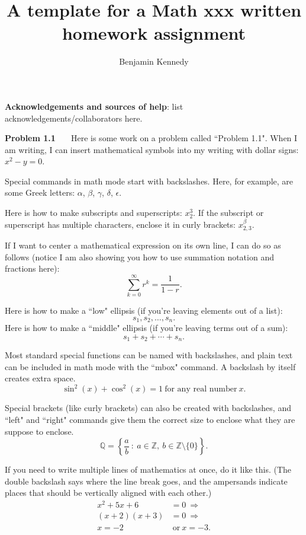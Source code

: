 \documentclass[10pt]{article}
\begin{document}
\title{A template for a Math xxx written homework assignment}

\author{Benjamin Kennedy}
\maketitle

\bigskip
\noindent
{\bf Acknowledgements and sources of help}: list acknowledgements/collaborators here.

\bigskip
\noindent
{\bf Problem 1.1 \ \ } Here is some work on a problem called ``Problem 1.1".  When I am writing, I can insert mathematical symbols into my writing with dollar signs: $x^2 - y = 0$.

Special commands in math mode start with backslashes.  Here, for example, are some Greek letters: $\alpha$, $\beta$, $\gamma$, $\delta$, $\epsilon$.

Here is how to make subscripts and superscripts: $x_2^3$.  If the subscript or superscript has multiple characters, enclose it in curly brackets: $x_{2,3}^{\beta}$.

If I want to center a mathematical expression on its own line, I can do so as follows (notice I am also showing you how to use summation notation and fractions here):
\[
\sum_{k = 0}^\infty r^k = \dfrac{1}{1-r}.
\]

Here is how to make a ``low" ellipsis (if you're leaving elements out of a list):
\[
s_1,s_2,\ldots,s_n.
\]
Here is how to make a ``middle" ellipsis (if you're leaving terms out of a sum):
\[
s_1 + s_2 + \cdots + s_n.
\]

Most standard special functions can be named with backslashes, and plain text can be included in math mode with the ``mbox" command.  A backslash by itself creates extra space.
\[
\sin^2(x) + \cos^2(x) = 1 \ \mbox{for any real number} \ x.
\]

Special brackets (like curly brackets) can also be created with backslashes, and ``left" and ``right" commands give them the correct size to enclose what they are suppose to enclose.
\[
\mathbb{Q} = \left\{ \frac{a}{b} \ : \ a \in \mathbb{Z}, \ b \in \mathbb{Z} \setminus \{0\} \right\}.
\]

If you need to write multiple lines of mathematics at once, do it like this.  (The double backslash says where the line break goes, and the ampersands indicate places that should be vertically aligned with each other.)
\begin{align*}
x^2 + 5x + 6 &= 0 \ \Longrightarrow \\
(x+2)(x+3) &= 0 \ \Longrightarrow \\
x = -2 & \ \mbox{or} \ x = -3.
\end{align*}
\end{document}
